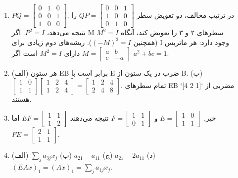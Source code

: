 \documentclass[12pt]{article}
\begin{document}
\begin{enumerate}
		\item $PQ= \begin{bmatrix} 0 & 1 & 0 \\ 0 & 0 & 1 \\ 1 & 0 & 0 \end{bmatrix}$. در ترتیب مخالف، دو تعویض سطر $QP= \begin{bmatrix} 0 & 0 & 1 \\ 1 & 0 & 0 \\ 0 & 1 & 0 \end{bmatrix}$ را نتیجه می‌دهد، $P^2=I$. اگر M سطرهای ۲ و ۳ را تعویض کند، آنگاه $M^2=I$ (همچنین $(-M)^2=I$). ریشه‌های دوم زیادی برای I وجود دارد: هر ماتریس $M= \begin{bmatrix} a & b \\ c & -a \end{bmatrix}$ دارای $M^2=I$ است اگر $a^2+bc=1$.
		
		\item (الف) هر ستون EB برابر است با E ضرب در یک ستون از B. (ب) $\begin{bmatrix} 1 & 0 \\ 1 & 1 \end{bmatrix} \begin{bmatrix} 1 & 2 & 4 \\ 1 & 2 & 4 \end{bmatrix}= \begin{bmatrix} 1 & 2 & 4 \\ 2 & 4 & 8 \end{bmatrix}$. تمام سطرهای EB مضربی از `[1 2 4]` هستند.
		
		\item خیر. $E= \begin{bmatrix} 1 & 0 \\ 1 & 1 \end{bmatrix}$ و $F= \begin{bmatrix} 1 & 1 \\ 0 & 1 \end{bmatrix}$ نتیجه می‌دهند $EF= \begin{bmatrix} 1 & 1 \\ 1 & 2 \end{bmatrix}$ اما $FE= \begin{bmatrix} 2 & 1 \\ 1 & 1 \end{bmatrix}$.
		
		\item (الف) $\sum_j a_{3j}x_j$ (ب) $a_{21}-a_{11}$ (ج) $a_{21}-2a_{11}$ (د) $(EAx)_1=(Ax)_1= \sum_j a_{1j}x_j$.
		

\end{enumerate}
\end{document}
